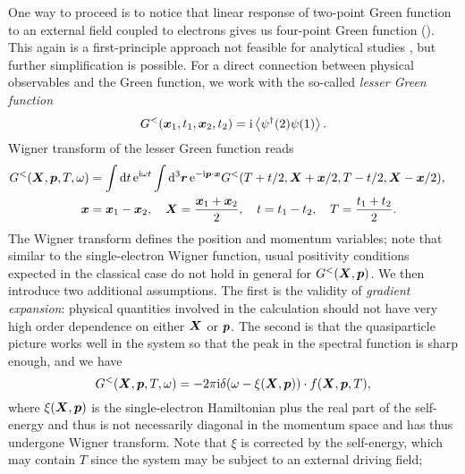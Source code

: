 \documentclass[hyperref, a4paper]{article}
\newcommand*{\ii}{\mathrm{i}}
\newcommand*{\ee}{\mathrm{e}}
\begin{document}
One way to proceed is to notice that 
linear response of two-point Green function 
to an external field coupled to electrons 
gives us four-point Green function
().
This again is a first-principle approach 
not feasible for analytical studies
\cite{attaccalite2011real},
but further simplification is possible.
For a direct connection between physical observables and the Green function,
we work with the so-called \emph{lesser Green function}
\begin{equation}
    G^<(\vb*{x}_1, t_1, \vb*{x}_2, t_2) = \ii \expval{\psi^\dagger(2) \psi(1)}.
\end{equation}
Wigner transform of the lesser Green function reads
\begin{equation}
    \begin{aligned}
        G^<(\vb*{X}, \vb*{p}, T, \omega) &= 
        \int \dd{t} \ee^{\ii \omega t}
        \int \dd[3]{\vb*{r}} \ee^{- \ii \vb*{p} \cdot \vb*{x}} 
        G^<(T + t / 2, \vb*{X} + \vb*{x} / 2, T - t/2, \vb*{X} - \vb*{x} / 2), \quad \\
        \vb*{x} &= \vb*{x}_1 - \vb*{x}_2, \quad 
        \vb*{X} = \frac{\vb*{x}_1 + \vb*{x}_2}{2}, \quad 
        t = t_1 - t_2, \quad T = \frac{t_1 + t_2}{2}.
    \end{aligned}
    \label{eq:g-to-f}
\end{equation}
The Wigner transform
defines the position and momentum variables;
note that similar to the single-electron Wigner function,
usual positivity conditions expected in the classical case 
do not hold in general for $G^<(\vb*{X}, \vb*{p})$.
We then introduce two additional assumptions.
The first is the validity of \emph{gradient expansion}:
physical quantities involved in the calculation 
should not have very high order dependence on either $\vb*{X}$ or $\vb*{p}$.
The second is that the quasiparticle picture works well in the system 
so that the peak in the spectral function is sharp enough, and we have 
\begin{equation}
    G^<(\vb*{X}, \vb*{p}, T, \omega) = - 2 \pi \ii \delta(\omega - \xi(\vb*{X}, \vb*{p})) \cdot 
    f(\vb*{X}, \vb*{p}, T),
    \label{eq:spectral-peak}
\end{equation}
where $\xi(\vb*{X}, \vb*{p})$ is the 
single-electron Hamiltonian plus the real part of the self-energy 
and thus is not necessarily diagonal in the momentum space 
and has thus undergone Wigner transform.
Note that $\xi$ is corrected by the self-energy,
which may contain $T$ since the system may be subject to an external driving field;
\end{document}
